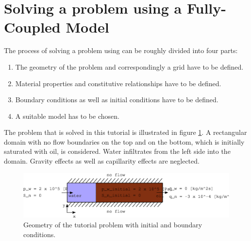 \clearpage
\section[Fully-coupled model]{Solving a problem using a Fully-Coupled Model}\label{tutorial-coupled}

The process of solving a problem using \Dumux can be roughly divided into four parts:
\begin{enumerate}
 \item The geometry of the problem and correspondingly a grid have to be defined.
 \item Material properties and constitutive relationships have to be defined.
 \item Boundary conditions as well as initial conditions have to be defined.
 \item A suitable model has to be chosen.
\end{enumerate}

The problem that is solved in this tutorial is illustrated in figure \ref{tutorial-coupled:problemfigure}. A rectangular domain with no flow boundaries on the top and on the bottom, which is initially saturated with oil, is considered. Water infiltrates from the left side into the domain. Gravity effects as well as capillarity effects are neglected.

\begin{figure}[h]
\centering
\includegraphics[width=0.9\linewidth,keepaspectratio]{EPS/tutorial-problemconfiguration}
\caption{Geometry of the tutorial problem with initial and boundary conditions.}\label{tutorial-coupled:problemfigure}
\end{figure}

